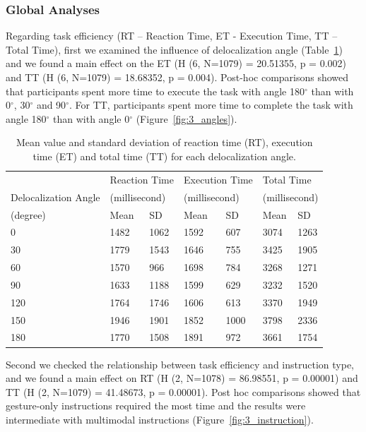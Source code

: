 \subsubsection{Global Analyses}
Regarding task efficiency (RT – Reaction Time, ET - Execution Time, TT – Total Time), first we examined the influence of delocalization angle (Table~\ref{tab:3_angles}) and we found a main effect on the ET (H (6, N=1079) = 20.51355, p = 0.002) and TT (H (6, N=1079) = 18.68352, p = 0.004). Post-hoc comparisons showed that participants spent more time to execute the task with angle 180$^{\circ}$ than with 0$^{\circ}$, 30$^{\circ}$ and 90$^{\circ}$. For TT, participants spent more time to complete the task with angle 180$^{\circ}$ than with angle 0$^{\circ}$ (Figure~\ref{fig:3_angles}).

\begin{table}[hbt]
\renewcommand{\arraystretch}{1.3}
\caption{Mean value and standard deviation of reaction time (RT), execution time (ET) and total time (TT) for each delocalization angle.}
\label{tab:3_angles}
\centering
\begin{tabular}{p{2.5cm} l l l l l l}
  \hline
     & \multicolumn{2}{p{3cm}}{Reaction Time} & \multicolumn{2}{p{3cm}}{Execution Time} & \multicolumn{2}{p{3cm}}{Total Time} \\
     Delocalization Angle & \multicolumn{2}{p{2.5cm}}{(millisecond)} & \multicolumn{2}{p{2.5cm}}{(millisecond)} & \multicolumn{2}{p{2.5cm}}{(millisecond)} \\
    (degree) & Mean & SD & Mean & SD & Mean & SD \\
  \hline
  0 & 1482 & 1062 & 1592 & 607 & 3074 & 1263 \\
  30 & 1779 & 1543 & 1646 & 755 & 3425 & 1905 \\
  60 & 1570 & 966 & 1698 & 784 & 3268 & 1271 \\
  90 & 1633 & 1188 & 1599 & 629 & 3232 & 1520 \\
  120 & 1764 & 1746 & 1606 & 613 & 3370 & 1949 \\
  150 & 1946 & 1901 & 1852 & 1000 & 3798 & 2336 \\
  180 & 1770 & 1508 & 1891 & 972 & 3661 & 1754 \\ \hline
\end{tabular}
\end{table}

Second we checked the relationship between task efficiency and instruction type, and we found a main effect on RT (H (2, N=1078) = 86.98551, p = 0.00001) and TT (H (2, N=1079) = 41.48673, p = 0.00001). Post hoc comparisons showed that gesture-only instructions required the most time and the results were intermediate with multimodal instructions (Figure~\ref{fig:3_instruction}).

